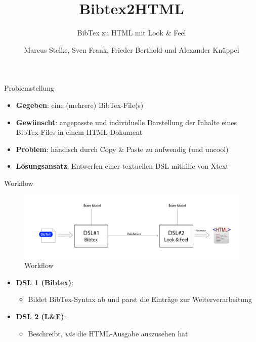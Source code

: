 \documentclass[fleqn,11pt,aspectratio=43]{beamer}
\title{Bibtex2HTML}
\subtitle{BibTex zu HTML mit Look \& Feel}
\author{Marcus Stelke, Sven Frank, Frieder Berthold und Alexander Knüppel}
\begin{document}
\begin{frame}[plain]
\titlepage
\end{frame}



\begin{frame}{Problemstellung}
\begin{itemize}
\item \textbf{Gegeben}: eine (mehrere) BibTex-File(s)
\item \textbf{Gewünscht}: angepasste und individuelle Darstellung der Inhalte eines BibTex-Files in einem HTML-Dokument
\item \textbf{Problem}: händisch durch Copy \& Paste zu aufwendig \tiny{(und uncool)}
\normalsize
\item \textbf{Lösungsansatz}: Entwerfen einer textuellen DSL mithilfe von Xtext  
\end{itemize}
\end{frame}


\begin{frame}{Workflow}
\begin{figure}
\includegraphics[scale=0.3]{../Images/workflow.png} 
\caption{Workflow}
\end{figure}
\begin{itemize}
\item \textbf{DSL 1 (Bibtex)}:
\begin{itemize}
\item Bildet BibTex-Syntax ab und parst die Einträge zur Weiterverarbeitung
\end{itemize}
\item \textbf{DSL 2 (L\&F)}:
\begin{itemize}
\item Beschreibt, \emph{wie} die HTML-Ausgabe auszusehen hat
\end{itemize}
\end{itemize}
\end{frame}
\end{document}
